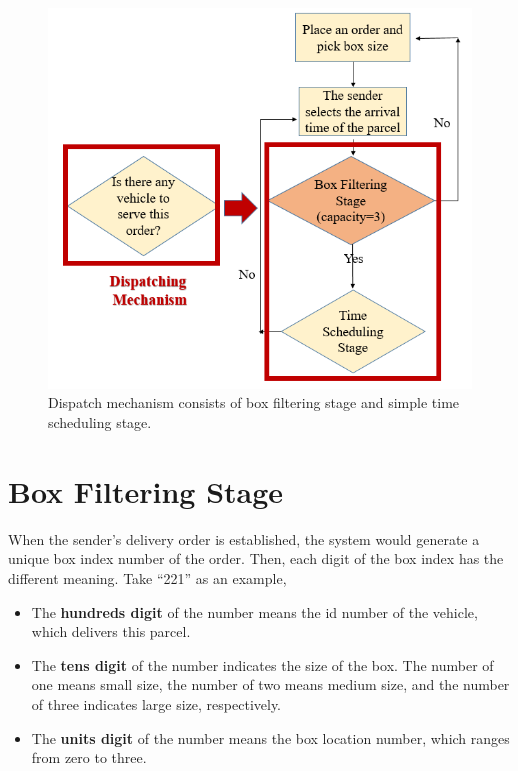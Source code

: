 \documentclass[12pt]{ksthesis}
\begin{document}
\begin{thesis}
{\begin{figure}[H]
\centering
\includegraphics[scale=0.7]{./Thesis_figures/F6-1_dispatching_mechanism.PNG}
\caption{\large Dispatch mechanism consists of box filtering stage and simple time scheduling stage.}
\vspace{0.5cm}
\label{Fig:Dispatch_mechanism}
\end{figure}

\section{Box Filtering Stage }
When the sender’s delivery order is established, the system would generate a unique box index number of the order. Then, each digit of the box index has the different meaning. Take “221” as an example,

\begin{itemize}


\item
The \textbf{hundreds digit} of the number means the id number of the vehicle, which delivers this parcel.

\item
The \textbf{tens digit} of the number indicates the size of the box. The number of one means small size, the number of two means medium size, and the number of three indicates large size, respectively.

\item
The \textbf{units digit} of the number means the box location number, which ranges from zero to three. 


\end{itemize}}
\end{thesis}
\end{document}
